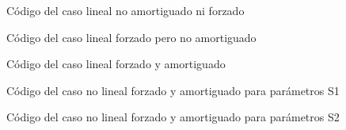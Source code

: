 \documentclass[11pt]{article}
\begin{document}
\begin{figure}

\caption{Código del caso lineal no amortiguado ni forzado}
\end{figure}

\begin{figure}

\caption{Código del caso lineal forzado pero no amortiguado}
\end{figure}

\begin{figure}

\caption{Código del caso lineal forzado y amortiguado}
\end{figure}

\begin{figure}

\caption{Código del caso no lineal forzado y amortiguado para parámetros S1}
\end{figure}

\begin{figure}

\caption{Código del caso no lineal forzado y amortiguado para parámetros S2}
\end{figure}
\end{document}
